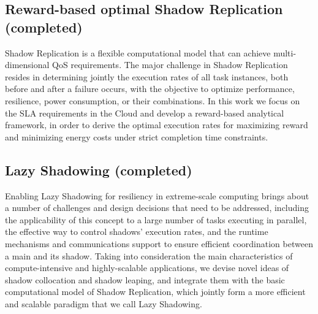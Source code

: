 
\subsection{Reward-based optimal Shadow Replication (completed)}
Shadow Replication is a flexible computational model that can achieve multi-dimensional QoS requirements. 
The major challenge in Shadow Replication resides in determining jointly the execution rates of all task instances, 
both before and after a failure occurs, with the objective to optimize performance, resilience, power consumption, or their combinations.
In this work we focus on the SLA requirements in the Cloud and develop a reward-based analytical framework, in order to derive the optimal execution rates for maximizing reward and minimizing energy 
costs under strict completion time constraints. 




\subsection{Lazy Shadowing (completed)}

Enabling Lazy Shadowing for resiliency in extreme-scale computing brings about a number of challenges and design decisions 
that need to be addressed, including the applicability of this concept to a large number of tasks executing in parallel, 
the effective way to control shadows’ execution rates, and the runtime mechanisms and communications support to ensure efficient 
coordination between a main and its shadow. Taking into consideration the main characteristics of compute-intensive and 
highly-scalable applications, 
we devise novel ideas of shadow collocation and shadow leaping, and integrate them with the basic computational model of Shadow Replication, which jointly form a more efficient and scalable paradigm that we call Lazy Shadowing.

